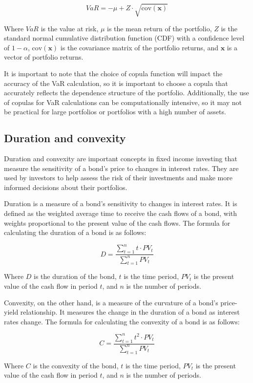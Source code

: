 \documentclass[12pt, a4paper, oneside]{article}
\begin{document}
$$VaR = -\mu + Z\cdot \sqrt{\text{cov}(\mathbf{x})}$$

Where $VaR$ is the value at risk, $\mu$ is the mean return of the portfolio, $Z$ is the standard normal cumulative distribution function (CDF) with a confidence level of $1-\alpha$, $\text{cov}(\mathbf{x})$ is the covariance matrix of the portfolio returns, and $\mathbf{x}$ is a vector of portfolio returns.

It is important to note that the choice of copula function will impact the accuracy of the VaR calculation, so it is important to choose a copula that accurately reflects the dependence structure of the portfolio. Additionally, the use of copulas for VaR calculations can be computationally intensive, so it may not be practical for large portfolios or portfolios with a high number of assets.



\subsection{ Duration and convexity }
Duration and convexity are important concepts in fixed income investing that measure the sensitivity of a bond's price to changes in interest rates. They are used by investors to help assess the risk of their investments and make more informed decisions about their portfolios.

Duration is a measure of a bond's sensitivity to changes in interest rates. It is defined as the weighted average time to receive the cash flows of a bond, with weights proportional to the present value of the cash flows. The formula for calculating the duration of a bond is as follows:

$$D = \frac{\sum_{t=1}^{n} t\cdot PV_t}{\sum_{t=1}^{n} PV_t}$$

Where $D$ is the duration of the bond, $t$ is the time period, $PV_t$ is the present value of the cash flow in period $t$, and $n$ is the number of periods.

Convexity, on the other hand, is a measure of the curvature of a bond's price-yield relationship. It measures the change in the duration of a bond as interest rates change. The formula for calculating the convexity of a bond is as follows:

$$C = \frac{\sum_{t=1}^{n} t^2\cdot PV_t}{\sum_{t=1}^{n} PV_t}$$

Where $C$ is the convexity of the bond, $t$ is the time period, $PV_t$ is the present value of the cash flow in period $t$, and $n$ is the number of periods.
\end{document}
